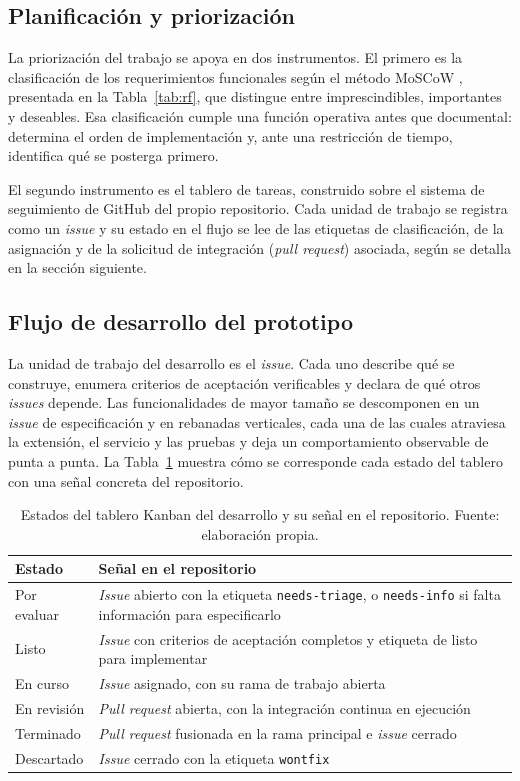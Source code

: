 \subsection{Planificación y priorización}

La priorización del trabajo se apoya en dos instrumentos. El primero es la clasificación de los requerimientos funcionales según el método MoSCoW \parencite{AgileBusinessConsortium2026}, presentada en la Tabla~\ref{tab:rf}, que distingue entre imprescindibles, importantes y deseables. Esa clasificación cumple una función operativa antes que documental: determina el orden de implementación y, ante una restricción de tiempo, identifica qué se posterga primero.

El segundo instrumento es el tablero de tareas, construido sobre el sistema de seguimiento de GitHub del propio repositorio. Cada unidad de trabajo se registra como un \textit{issue} y su estado en el flujo se lee de las etiquetas de clasificación, de la asignación y de la solicitud de integración (\textit{pull request}) asociada, según se detalla en la sección siguiente.

\subsection{Flujo de desarrollo del prototipo}

La unidad de trabajo del desarrollo es el \textit{issue}. Cada uno describe qué se construye, enumera criterios de aceptación verificables y declara de qué otros \textit{issues} depende. Las funcionalidades de mayor tamaño se descomponen en un \textit{issue} de especificación y en rebanadas verticales, cada una de las cuales atraviesa la extensión, el servicio y las pruebas y deja un comportamiento observable de punta a punta. La Tabla~\ref{tab:estados-kanban} muestra cómo se corresponde cada estado del tablero con una señal concreta del repositorio.

\begin{table}[t]
  \centering
  \caption{Estados del tablero Kanban del desarrollo y su señal en el repositorio. Fuente: elaboración propia.}
  \label{tab:estados-kanban}
  \begin{tabular}{l p{9cm}}
    \hline
    \textbf{Estado} & \textbf{Señal en el repositorio} \\
    \hline
    Por evaluar & \textit{Issue} abierto con la etiqueta \texttt{needs-triage}, o \texttt{needs-info} si falta información para especificarlo \\
    Listo & \textit{Issue} con criterios de aceptación completos y etiqueta de listo para implementar \\
    En curso & \textit{Issue} asignado, con su rama de trabajo abierta \\
    En revisión & \textit{Pull request} abierta, con la integración continua en ejecución \\
    Terminado & \textit{Pull request} fusionada en la rama principal e \textit{issue} cerrado \\
    Descartado & \textit{Issue} cerrado con la etiqueta \texttt{wontfix} \\
    \hline
  \end{tabular}
\end{table}

